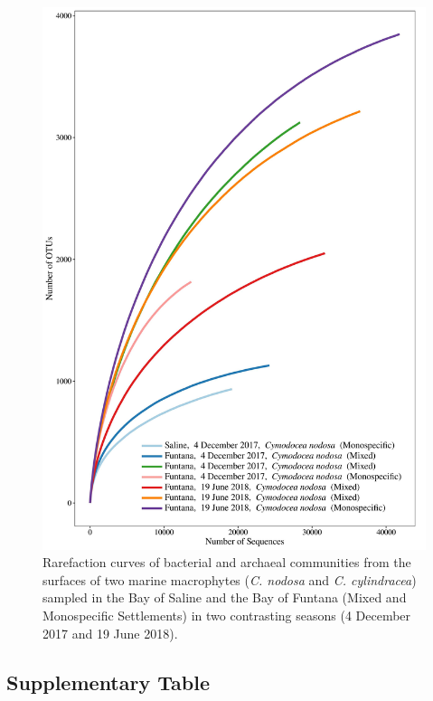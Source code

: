 \documentclass[12pt,]{article}
\begin{document}
\begin{figure}[H]

{\centering \includegraphics[width=0.8\linewidth]{../results/figures/rarefaction} 

}

\caption{Rarefaction curves of bacterial and archaeal communities from the surfaces of two marine macrophytes (\textit{C. nodosa} and \textit{C. cylindracea}) sampled in the Bay of Saline and the Bay of Funtana (Mixed and Monospecific Settlements) in two contrasting seasons (4 December 2017 and 19 June 2018).\label{rarefaction}}\label{fig:unnamed-chunk-1}
\end{figure}

\newpage

\hypertarget{supplementary-table}{%
\subsection{Supplementary Table}\label{supplementary-table}}

\begingroup\fontsize{9}{11}\selectfont
\end{document}

